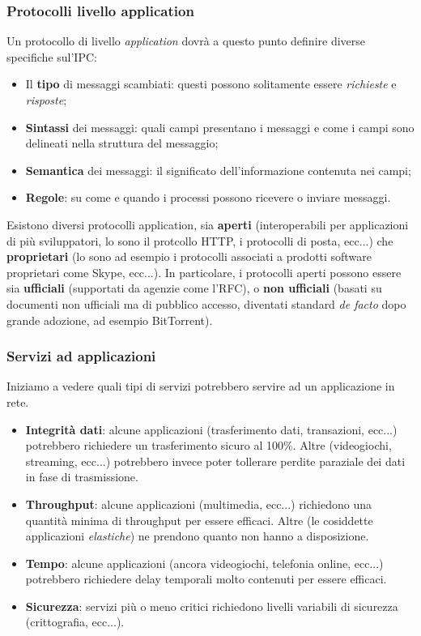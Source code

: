 \documentclass[a4paper,11pt]{article}
\begin{document}
\subsubsection{Protocolli livello application}
Un protocollo di livello \textit{application} dovrà a questo punto definire diverse specifiche sul'IPC:
\begin{itemize}
	\item Il \textbf{tipo} di messaggi scambiati: questi possono solitamente essere \textit{richieste} e \textit{risposte};
	\item \textbf{Sintassi} dei messaggi: quali campi presentano i messaggi e come i campi sono delineati nella struttura del messaggio;
	\item \textbf{Semantica} dei messaggi: il significato dell'informazione contenuta nei campi;
	\item \textbf{Regole}: su come e quando i processi possono ricevere o inviare messaggi.
\end{itemize}

Esistono diversi protocolli application, sia \textbf{aperti} (interoperabili per applicazioni di più sviluppatori, lo sono il protcollo HTTP, i protocolli di posta, ecc...) che \textbf{proprietari} (lo sono ad esempio i protocolli associati a prodotti software proprietari come Skype, ecc...).
In particolare, i protocolli aperti possono essere sia \textbf{ufficiali} (supportati da agenzie come l'RFC), o \textbf{non ufficiali} (basati su documenti non ufficiali ma di pubblico accesso, diventati standard \textit{de facto} dopo grande adozione, ad esempio BitTorrent).

\subsubsection{Servizi ad applicazioni}
Iniziamo a vedere quali tipi di servizi potrebbero servire ad un applicazione in rete.

\begin{itemize}
	\item \textbf{Integrità dati}: alcune applicazioni (trasferimento dati, transazioni, ecc...) potrebbero richiedere un trasferimento sicuro al 100\%. Altre (videogiochi, streaming, ecc...) potrebbero invece poter tollerare perdite paraziale dei dati in fase di trasmissione.
	\item \textbf{Throughput}: alcune applicazioni (multimedia, ecc...) richiedono una quantità minima di throughput per essere efficaci. Altre (le cosiddette applicazioni \textit{elastiche}) ne prendono quanto non hanno a disposizione.
	\item \textbf{Tempo}: alcune applicazioni (ancora videogiochi, telefonia online, ecc...) potrebbero richiedere delay temporali molto contenuti per essere efficaci.
	\item \textbf{Sicurezza}: servizi più o meno critici richiedono livelli variabili di sicurezza (crittografia, ecc...).
\end{itemize}
\end{document}
